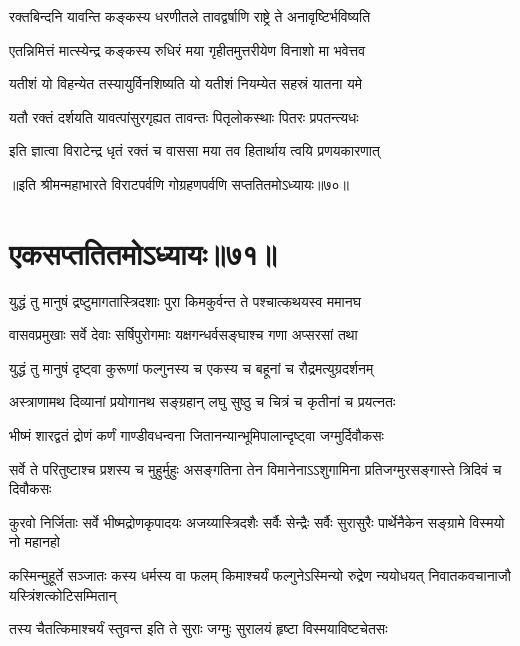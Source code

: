 


\twolineshloka
{रक्तबिन्दनि यावन्ति कङ्कस्य धरणीतले}
{तावद्वर्षाणि राष्ट्रे ते अनावृष्टिर्भविष्यति}


\twolineshloka
{एतन्निमित्तं मात्स्येन्द्र कङ्कस्य रुधिरं मया}
{गृहीतमुत्तरीयेण विनाशो मा भवेत्तव}


\twolineshloka
{यतीशं यो विहन्येत तस्यायुर्विनशिष्यति}
{यो यतीशं नियम्येत सहस्रं यातना यमे}


\twolineshloka
{यतौ रक्तं दर्शयति यावत्पांसुरगृह्यत}
{तावन्तः पितृलोकस्थाः पितरः प्रपतन्त्यधः}


\twolineshloka
{इति ज्ञात्वा विराटेन्द्र धृतं रक्तं च वाससा}
{मया तव हितार्थाय त्वयि प्रणयकारणात्}

॥इति श्रीमन्महाभारते विराटपर्वणि गोग्रहणपर्वणि सप्ततितमोऽध्यायः॥७०॥

\chapter{एकसप्ततितमोऽध्यायः॥७१॥}

\twolineshloka
{युद्धं तु मानुषं द्रष्टुमागतास्त्रिदशाः पुरा}
{किमकुर्वन्त ते पश्चात्कथयस्व ममानघ}



\twolineshloka
{वासवप्रमुखाः सर्वे देवाः सर्षिपुरोगमाः}
{यक्षगन्धर्वसङ्घाश्च गणा अप्सरसां तथा}


\twolineshloka
{युद्धं तु मानुषं दृष्ट्वा कुरूणां फल्गुनस्य च}
{एकस्य च बहूनां च रौद्रमत्युग्रदर्शनम्}


\twolineshloka
{अस्त्राणामथ दिव्यानां प्रयोगानथ सङ्ग्रहान्}
{लघु सुष्ठु च चित्रं च कृतीनां च प्रयत्नतः}


\twolineshloka
{भीष्मं शारद्वतं द्रोणं कर्णं गाण्डीवधन्वना}
{जितानन्यान्भूमिपालान्दृष्ट्वा जग्मुर्दिवौकसः}


\threelineshloka
{सर्वे ते परितुष्टाश्च प्रशस्य च मुहुर्मुहुः}
{असङ्गतिना तेन विमानेनाऽऽशुगामिना}
{प्रतिजग्मुरसङ्गास्ते त्रिदिवं च दिवौकसः}


\threelineshloka
{कुरवो निर्जिताः सर्वे भीष्मद्रोणकृपादयः}
{अजय्यास्त्रिदशैः सर्वैः सेन्द्रैः सर्वैः सुरासुरैः}
{पार्थेनैकेन सङ्ग्रामे विस्मयो नो महानहो}


\onelineshloka
{कस्मिन्मुहूर्ते सञ्जातः कस्य धर्मस्य वा फलम्}
\twolineshloka
{किमाश्चर्यं फल्गुनेऽस्मिन्यो रुद्रेण न्ययोधयत्}
{निवातकवचानाजौ यस्त्रिंशत्कोटिसम्मितान्}


\twolineshloka
{तस्य चैतत्किमाश्चर्यं स्तुवन्त इति ते सुराः}
{जग्मुः सुरालयं हृष्टा विस्मयाविष्टचेतसः}



